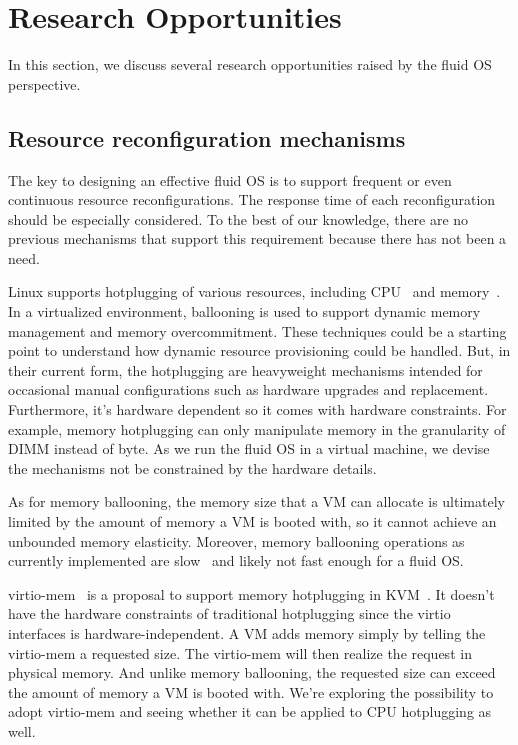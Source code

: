  
\section{Research Opportunities}
\label{sec:opportunities}
In this section, we discuss several research opportunities raised by
the fluid OS perspective.

\subsection{Resource reconfiguration mechanisms}  The key to
designing an effective fluid OS is to support frequent or even
continuous resource reconfigurations.
The response time of each reconfiguration
should be especially considered.  To the best of our knowledge,
there are no previous mechanisms that support this requirement
because there has not been a need.

Linux supports hotplugging of various resources, including
CPU~\cite{linux_cpu_hotplug} and memory~\cite{linux_memory_hotplug}.
In a virtualized environment, ballooning\cite{waldspurger02} is
used to support dynamic memory management and memory overcommitment.
These techniques could be a starting point to understand how dynamic
resource provisioning could be handled.
But, in their current form, the hotplugging are heavyweight mechanisms
intended for occasional manual configurations such as hardware
upgrades and replacement. Furthermore, it's hardware dependent so it
comes with hardware constraints.  For example, memory hotplugging can
only manipulate memory in the granularity of DIMM instead of byte.  As
we run the fluid OS in a virtual machine, we devise the mechanisms not
be constrained by the hardware details.

As for memory ballooning, the memory size that a VM can allocate is
ultimately limited by the amount of memory a VM is booted with,
so it cannot achieve an unbounded memory elasticity.
Moreover, memory ballooning operations as currently implemented are
slow~\cite{amit2014vswapper} and likely not fast enough for a fluid OS.

virtio-mem~\cite{virtio-mem} is a proposal to support memory
hotplugging in KVM~\cite{KVM}.  It doesn't have the hardware
constraints of traditional hotplugging since the
virtio~\cite{jones2010virtio} interfaces is hardware-independent.  A
VM adds memory simply by telling the virtio-mem a requested size.  The
virtio-mem will then realize the request in physical memory.  And
unlike memory ballooning, the requested size can exceed the amount of
memory a VM is booted with.  We're exploring the possibility to adopt
virtio-mem and seeing whether it can be applied to CPU hotplugging as
well.

